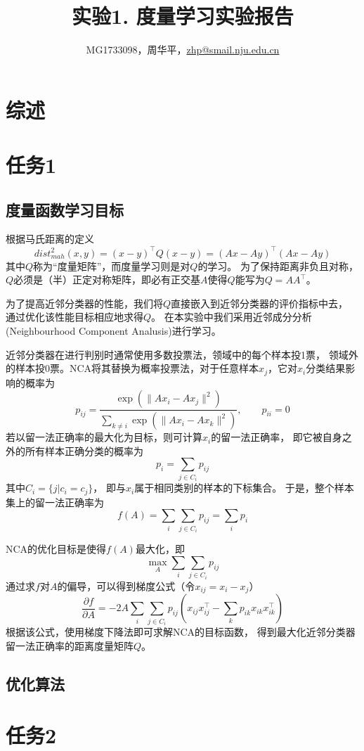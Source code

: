 \documentclass[a4paper,UTF8]{article}
\theoremstyle{definition}
\begin{document}
\title{实验1. 度量学习实验报告}
\author{MG1733098，周华平，\url{zhp@smail.nju.edu.cn}}
\maketitle

\section*{综述}

\section*{任务1}

\subsection*{度量函数学习目标}

根据马氏距离的定义
\[
	dist_{mah}^2(x, y) = (x - y)^\top Q(x - y) = (Ax - Ay)^\top (Ax - Ay)
\]
其中$Q$称为“度量矩阵”，而度量学习则是对$Q$的学习。
为了保持距离非负且对称，$Q$必须是（半）正定对称矩阵，即必有正交基$A$使得$Q$能写为$Q = AA^\top$。

为了提高近邻分类器的性能，我们将$Q$直接嵌入到近邻分类器的评价指标中去，
通过优化该性能目标相应地求得$Q$。
在本实验中我们采用近邻成分分析(Neighbourhood Component Analusis)进行学习。

近邻分类器在进行判别时通常使用多数投票法，领域中的每个样本投1票，
领域外的样本投0票。NCA将其替换为概率投票法，对于任意样本$x_{j}$，它对$x_{i}$分类结果影响的概率为
\[
	p_{ij} = \frac{\exp(\lVert Ax_{i} - Ax_{j} \rVert^2)}
	{\sum_{k \neq i} \exp(\lVert Ax_{i} - Ax_{k} \rVert^2)}, \qquad
	p_{ii} = 0
\]
若以留一法正确率的最大化为目标，则可计算$x_{i}$的留一法正确率，
即它被自身之外的所有样本正确分类的概率为
\[
	p_{i} = \sum_{j \in C_{i}} p_{ij}
\]
其中$C_{i} = \lbrace j \vert c_{i} = c_{j} \rbrace$，
即与$x_{i}$属于相同类别的样本的下标集合。
于是，整个样本集上的留一法正确率为
\[
	f(A) = \sum_{i} \sum_{j \in C_{i}} p_{ij} = \sum_{i} p_{i}
\]

NCA的优化目标是使得$f(A)$最大化，即
\[
	\max_{A} \sum_{i} \sum_{j \in C_{i}} p_{ij}
\]
通过求$f$对$A$的偏导，可以得到梯度公式（令$x_{ij} = x_{i} - x_{j}$）
\[
	\frac{\partial f}{\partial A} =
	-2A \sum_{i} \sum_{j \in C_{i}} p_{ij}( x_{ij} x_{ij}^\top - \sum_{k} p_{ik} x_{ik} x_{ik}^\top)
\]
根据该公式，使用梯度下降法即可求解NCA的目标函数，
得到最大化近邻分类器留一法正确率的距离度量矩阵$Q$。

\subsection*{优化算法}



\section*{任务2}
\end{document}
